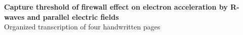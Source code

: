\documentclass[11pt,a4paper]{article}
\begin{document}
\begin{center}
{\LARGE\bfseries Capture threshold of firewall effect on electron acceleration by R-waves and parallel electric fields}\\[5pt]
{\large Organized transcription of four handwritten pages}
\end{center}
\end{document}
